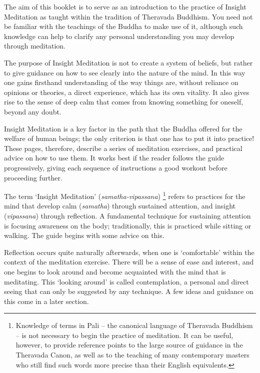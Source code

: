 
The aim of this booklet is to serve as an introduction to the practice
of Insight Meditation as taught within the tradition of Theravada
Buddhism. You need not be familiar with the teachings of the Buddha to
make use of it, although such knowledge can help to clarify any personal
understanding you may develop through meditation.

The purpose of Insight Meditation is not to create a system of beliefs, but rather to
give guidance on how to see clearly into the nature of the mind. In
this way one gains firsthand understanding of the way things are,
without reliance on opinions or theories, a direct experience, which has
its own vitality. It also gives rise to the sense of deep calm that
comes from knowing something for oneself, beyond any doubt.

Insight Meditation is a key factor in the path that the Buddha offered for the
welfare of human beings; the only criterion is that one has to put it
into practice! These pages, therefore, describe a series of meditation
exercises, and practical advice on how to use them. It works best if the
reader follows the guide progressively, giving each sequence of
instructions a good workout before proceeding further.

The term `Insight Meditation' (\emph{samatha-vipassana})
\footnote{Knowledge of terms in Pali -- the canonical language of
Theravada Buddhism -- is not necessary to begin the practice of
meditation. It can be useful, however, to provide reference points to
the large source of guidance in the Theravada Canon, as well as to the
teaching of many contemporary masters who still find such words more
precise than their English equivalents.}
refers to
practices for the mind that develop calm (\emph{samatha}) through
sustained attention, and insight (\emph{vipassana}) through reflection.
A fundamental technique for sustaining attention is focusing awareness
on the body; traditionally, this is practiced while sitting or walking.
The guide begins with some advice on this.

Reflection occurs quite naturally afterwards, when one is `comfortable' within the context of
the meditation exercise. There will be a sense of ease and interest, and
one begins to look around and become acquainted with the mind that is
meditating. This `looking around' is called contemplation, a personal
and direct seeing that can only be suggested by any technique. A few
ideas and guidance on this come in a later section.

